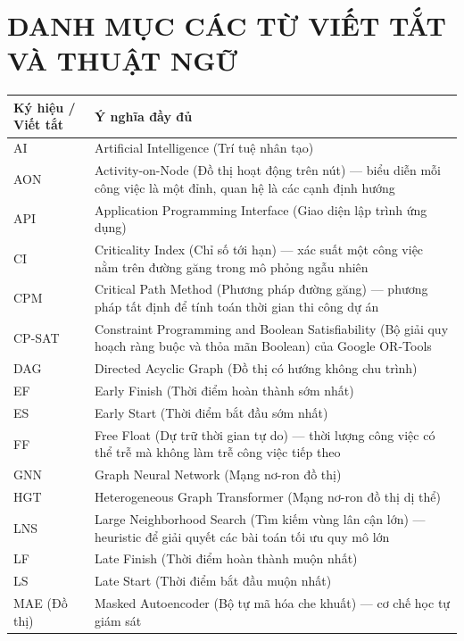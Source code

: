 \chapter*{DANH MỤC CÁC TỪ VIẾT TẮT VÀ THUẬT NGỮ}

\begin{longtable}{p{4.2cm} p{10.3cm}}
    \toprule
    \textbf{Ký hiệu / Viết tắt} & \textbf{Ý nghĩa đầy đủ} \\
    \midrule
    \endfirsthead

    AI & Artificial Intelligence (Trí tuệ nhân tạo) \\
    AON & Activity-on-Node (Đồ thị hoạt động trên nút) --- biểu diễn mỗi công việc là một đỉnh, quan hệ là các cạnh định hướng \\
    API & Application Programming Interface (Giao diện lập trình ứng dụng) \\
    CI & Criticality Index (Chỉ số tới hạn) --- xác suất một công việc nằm trên đường găng trong mô phỏng ngẫu nhiên \\
    CPM & Critical Path Method (Phương pháp đường găng) --- phương pháp tất định để tính toán thời gian thi công dự án \\
    CP-SAT & Constraint Programming and Boolean Satisfiability (Bộ giải quy hoạch ràng buộc và thỏa mãn Boolean) của Google OR-Tools \\
    DAG & Directed Acyclic Graph (Đồ thị có hướng không chu trình) \\
    EF & Early Finish (Thời điểm hoàn thành sớm nhất) \\
    ES & Early Start (Thời điểm bắt đầu sớm nhất) \\
    FF & Free Float (Dự trữ thời gian tự do) --- thời lượng công việc có thể trễ mà không làm trễ công việc tiếp theo \\
    GNN & Graph Neural Network (Mạng nơ-ron đồ thị) \\
    HGT & Heterogeneous Graph Transformer (Mạng nơ-ron đồ thị dị thể) \\
    LNS & Large Neighborhood Search (Tìm kiếm vùng lân cận lớn) --- heuristic để giải quyết các bài toán tối ưu quy mô lớn \\
    LF & Late Finish (Thời điểm hoàn thành muộn nhất) \\
    LS & Late Start (Thời điểm bắt đầu muộn nhất) \\
    MAE (Đồ thị) & Masked Autoencoder (Bộ tự mã hóa che khuất) --- cơ chế học tự giám sát \\

\end{longtable}
